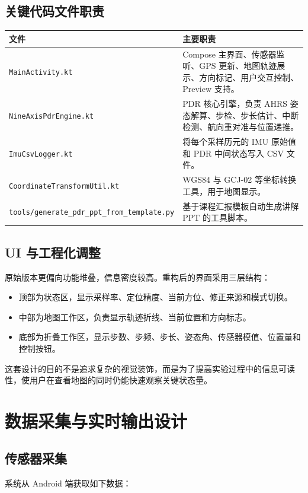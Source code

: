 \documentclass[12pt,a4paper]{ctexart}
\begin{document}
\subsection{关键代码文件职责}
\begin{longtable}{p{}p{}}
\toprule
文件 & 主要职责 \\
\midrule
\endhead
\texttt{MainActivity.kt} & Compose 主界面、传感器监听、GPS 更新、地图轨迹展示、方向标记、用户交互控制、Preview 支持。 \\
\texttt{NineAxisPdrEngine.kt} & PDR 核心引擎，负责 AHRS 姿态解算、步检、步长估计、中断检测、航向重对准与位置递推。 \\
\texttt{ImuCsvLogger.kt} & 将每个采样历元的 IMU 原始值和 PDR 中间状态写入 CSV 文件。 \\
\texttt{CoordinateTransformUtil.kt} & WGS84 与 GCJ-02 等坐标转换工具，用于地图显示。 \\
\texttt{tools/generate\_pdr\_ppt\_from\_template.py} & 基于课程汇报模板自动生成讲解 PPT 的工具脚本。 \\
\bottomrule
\end{longtable}

\subsection{UI 与工程化调整}
原始版本更偏向功能堆叠，信息密度较高。重构后的界面采用三层结构：

\begin{itemize}
    \item 顶部为状态区，显示采样率、定位精度、当前方位、修正来源和模式切换。
    \item 中部为地图工作区，负责显示轨迹折线、当前位置和方向标志。
    \item 底部为折叠工作区，显示步数、步频、步长、姿态角、传感器模值、位置量和控制按钮。
\end{itemize}

这套设计的目的不是追求复杂的视觉装饰，而是为了提高实验过程中的信息可读性，使用户在查看地图的同时仍能快速观察关键状态量。

\section{数据采集与实时输出设计}
\subsection{传感器采集}
系统从 Android 端获取如下数据：
\end{document}

